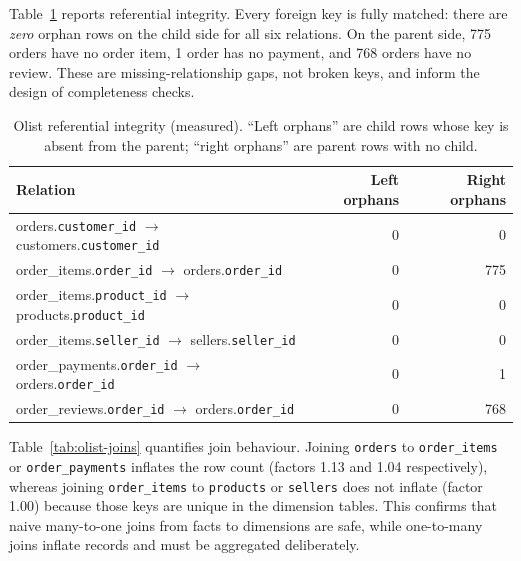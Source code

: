 \documentclass[11pt,a4paper]{article}
\newcommand{\code}[1]{\texttt{#1}}
\begin{document}
Table~\ref{tab:olist-fk} reports referential integrity. Every foreign key is fully matched: there are \emph{zero} orphan rows on the child side for all six relations. On the parent side, 775 orders have no order item, 1 order has no payment, and 768 orders have no review. These are missing-relationship gaps, not broken keys, and inform the design of completeness checks.

\begin{table}[H]
\centering
\small
\caption{Olist referential integrity (measured). ``Left orphans'' are child rows whose key is absent from the parent; ``right orphans'' are parent rows with no child.}
\label{tab:olist-fk}
\begin{tabular}{lrr}
\toprule
\textbf{Relation} & \textbf{Left orphans} & \textbf{Right orphans} \\
\midrule
orders.\code{customer\_id} $\rightarrow$ customers.\code{customer\_id} & 0 & 0 \\
order\_items.\code{order\_id} $\rightarrow$ orders.\code{order\_id} & 0 & 775 \\
order\_items.\code{product\_id} $\rightarrow$ products.\code{product\_id} & 0 & 0 \\
order\_items.\code{seller\_id} $\rightarrow$ sellers.\code{seller\_id} & 0 & 0 \\
order\_payments.\code{order\_id} $\rightarrow$ orders.\code{order\_id} & 0 & 1 \\
order\_reviews.\code{order\_id} $\rightarrow$ orders.\code{order\_id} & 0 & 768 \\
\bottomrule
\end{tabular}
\end{table}

Table~\ref{tab:olist-joins} quantifies join behaviour. Joining \code{orders} to \code{order\_items} or \code{order\_payments} inflates the row count (factors 1.13 and 1.04 respectively), whereas joining \code{order\_items} to \code{products} or \code{sellers} does not inflate (factor 1.00) because those keys are unique in the dimension tables. This confirms that naive many-to-one joins from facts to dimensions are safe, while one-to-many joins inflate records and must be aggregated deliberately.
\end{document}
